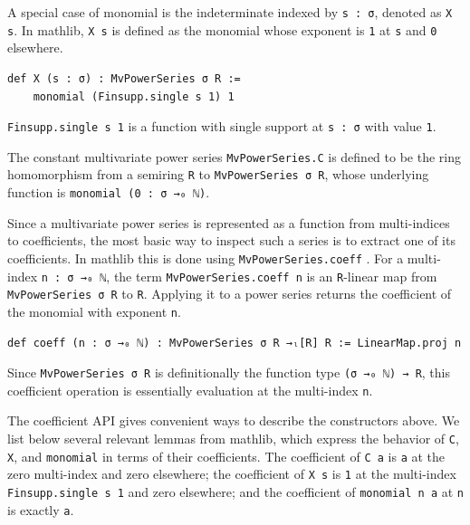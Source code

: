 A special case of monomial is the indeterminate indexed by \lstinline|s : σ|,
denoted as \lstinline|X s|.
In mathlib, \lstinline|X s|
\href{https://leanprover-community.github.io/mathlib4_docs/Mathlib/RingTheory/MvPowerSeries/Basic.html#MvPowerSeries.X}{\faExternalLink}
is defined as the monomial whose exponent
is \lstinline|1| at \lstinline|s| and \lstinline|0| elsewhere.

\begin{lstlisting}
def X (s : σ) : MvPowerSeries σ R :=
    monomial (Finsupp.single s 1) 1
\end{lstlisting}

\lstinline|Finsupp.single s 1| is a function with single support at \lstinline|s : σ|
with value \lstinline|1|.

The constant multivariate power series
\lstinline|MvPowerSeries.C|
\href{https://leanprover-community.github.io/mathlib4_docs/Mathlib/RingTheory/MvPowerSeries/Basic.html#MvPowerSeries.C}{\faExternalLink}
is defined to be the ring homomorphism from a semiring \lstinline|R| to
\lstinline|MvPowerSeries σ R|, whose underlying function is
\lstinline|monomial (0 : σ →₀ ℕ)|.


Since a multivariate power series is represented as a function from
multi-indices to coefficients, the most basic way to inspect such a
series is to extract one of its coefficients.  In mathlib this is done
using \lstinline|MvPowerSeries.coeff|
\href{https://leanprover-community.github.io/mathlib4_docs/Mathlib/RingTheory/MvPowerSeries/Basic.html#MvPowerSeries.coeff}{\faExternalLink}
.
For a multi-index
\lstinline|n : σ →₀ ℕ|, the term \lstinline|MvPowerSeries.coeff n| is an
\lstinline|R|-linear map from \lstinline|MvPowerSeries σ R| to
\lstinline|R|.  Applying it to a power series returns the coefficient of
the monomial with exponent \lstinline|n|.

\begin{lstlisting}
def coeff (n : σ →₀ ℕ) : MvPowerSeries σ R →ₗ[R] R := LinearMap.proj n
\end{lstlisting}

Since \lstinline|MvPowerSeries σ R| is definitionally the function type
\lstinline|(σ →₀ ℕ) → R|, this coefficient operation is essentially
evaluation at the multi-index \lstinline|n|.

The coefficient API gives convenient ways to describe the constructors
above.  We list below several relevant lemmas from mathlib, which express
the behavior of \lstinline|C|, \lstinline|X|, and \lstinline|monomial|
in terms of their coefficients.  The coefficient of \lstinline|C a| is
\lstinline|a| at the zero multi-index and zero elsewhere; the coefficient
of \lstinline|X s| is \lstinline|1| at the multi-index
\lstinline|Finsupp.single s 1| and zero elsewhere; and the coefficient of
\lstinline|monomial n a| at \lstinline|n| is exactly \lstinline|a|.

